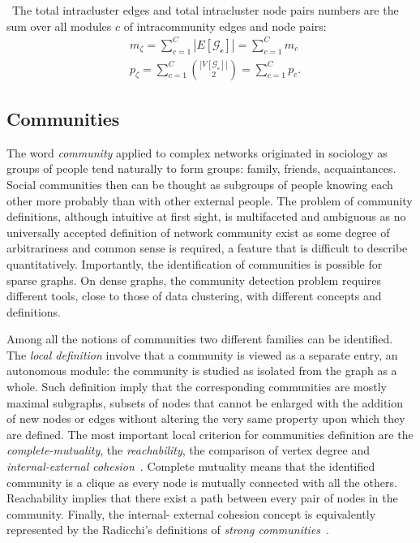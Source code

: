 \noindent\textbullet \, The total intracluster edges and total intracluster node pairs numbers are the sum over all modules $c$ of intracommunity edges and node pairs:
\begin{align}
&m_\zeta= \sum \limits_{c=1}^C |E[\mathcal{G_c}]| = \sum \limits_{c=1}^C m_c \\
&p_\zeta= \sum \limits_{c=1}^C \binom{|V[\mathcal{G_c}]|}{2} = \sum \limits_{c=1}^C p_c.
\end{align}

\subsection{Communities}\label{sec:communities}
The word \emph{community} applied to complex networks originated in sociology as groups of people tend naturally to form groups: family, friends, acquaintances. Social communities then can be thought as subgroups of people knowing each other more probably than with other external people. 
The problem of community definitions, although intuitive at first sight, is multifaceted and ambiguous as no universally accepted definition of network community exist as some degree of arbitrariness and common sense is required, a feature that is difficult to describe quantitatively. 
Importantly, the identification of communities is possible for sparse graphs. On dense graphs, the community detection problem requires different tools, close to those of data clustering, with different concepts and definitions.

Among all the notions of communities two different families can be identified. The \emph{local definition} involve that a community is viewed as a separate entry, an autonomous module: the community is studied as isolated from the graph as a whole.
Such definition imply that the corresponding communities are mostly maximal subgraphs, subsets of nodes that cannot be enlarged with the addition of new nodes or edges without altering the very same property upon which they are defined.
The most important local criterion for communities definition are the \emph{complete-mutuality}, the \emph{reachability}, the comparison of vertex degree and \emph{internal-external cohesion}~\cite{wasserman1994,alba1973}. Complete mutuality means that the identified community is a clique as every node is mutually connected with all the others. Reachability implies that there exist a path between every pair of nodes in the community. Finally, the internal- external cohesion concept is equivalently represented by the Radicchi's definitions of \emph{strong communities}~\cite{radicchi2004}.

